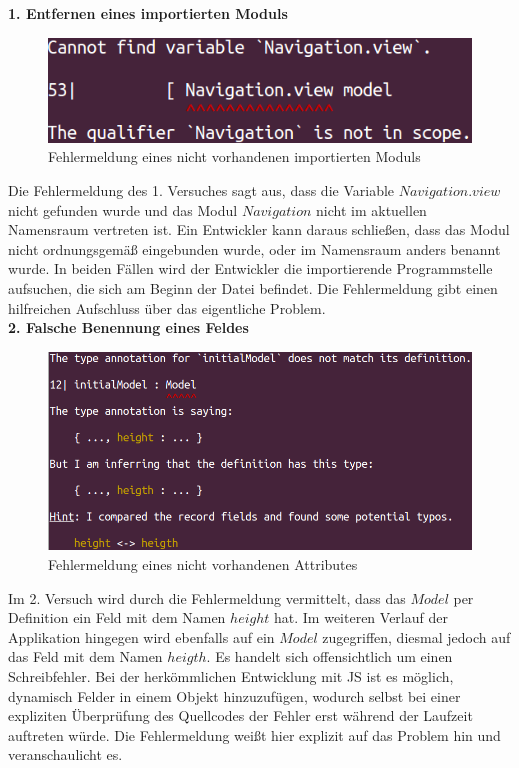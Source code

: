 \textbf{1. Entfernen eines importierten Moduls}\\
\begin{figure}[h!]
\centering
\includegraphics[scale=0.5]{img/import-error.png}
\caption{Fehlermeldung eines nicht vorhandenen importierten Moduls}
\end{figure}
Die Fehlermeldung des 1. Versuches sagt aus, dass die Variable $Navigation.view$ nicht gefunden wurde und das Modul $Navigation$ nicht im aktuellen Namensraum vertreten ist. Ein Entwickler kann daraus schließen, dass das Modul nicht ordnungsgemäß eingebunden wurde, oder im Namensraum anders benannt wurde. In beiden Fällen wird der Entwickler die importierende Programmstelle aufsuchen, die sich am Beginn der Datei befindet. Die Fehlermeldung gibt einen hilfreichen Aufschluss über das eigentliche Problem.
\\

\textbf{2. Falsche Benennung eines Feldes}\\
\begin{figure}[h!]
\centering
\includegraphics[scale=0.4]{img/definition-error.png}
\caption{Fehlermeldung eines nicht vorhandenen Attributes}
\end{figure}
Im 2. Versuch wird durch die Fehlermeldung vermittelt, dass das $Model$ per Definition ein Feld mit dem Namen $height$ hat. Im weiteren Verlauf der Applikation hingegen wird ebenfalls auf ein $Model$ zugegriffen, diesmal jedoch auf das Feld mit dem Namen $heigth$. Es handelt sich offensichtlich um einen Schreibfehler. Bei der herkömmlichen Entwicklung mit \ac{JS} ist es möglich, dynamisch Felder in einem Objekt hinzuzufügen, wodurch selbst bei einer expliziten Überprüfung des Quellcodes der Fehler erst während der Laufzeit auftreten würde. Die Fehlermeldung weißt hier explizit auf das Problem hin und veranschaulicht es.
\\

